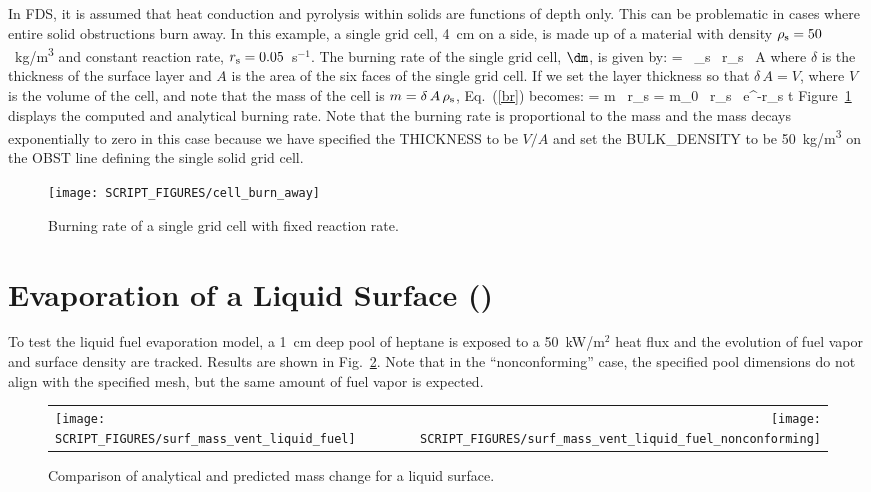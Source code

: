 \documentclass[11pt]{book}
\begin{document}
In FDS, it is assumed that heat conduction and pyrolysis within solids are functions of depth only. This can be problematic in cases where entire solid obstructions burn away. In this example, a single grid cell, 4~cm on a side, is made up of a material with density $\rho_{\rm s}=50$~\si{kg/m^3} and constant reaction rate, $r_{\rm s}=0.05$~s$^{-1}$. The burning rate of the single grid cell, $\dm$, is given by:
\be
   \dm = \delta \, \rho_{\rm s} \, r_{\rm s} \, A  \label{br}
\ee
where $\delta$ is the thickness of the surface layer and $A$ is the area of the six faces of the single grid cell. If we set the layer thickness so that $\delta \, A=V$, where $V$ is the volume of the cell, and note that the mass of the cell is $m=\delta \, A \, \rho_{\rm s}$, Eq.~(\ref{br}) becomes:
\be
   \dm = m \, r_{\rm s} = m_0 \, r_{\rm s} \, {\rm e}^{-r_{\rm s} t}
\ee
Figure~\ref{cell_burn_away_fig} displays the computed and analytical burning rate. Note that the burning rate is proportional to the mass and the mass decays exponentially to zero in this case because we have specified the {\ct THICKNESS} to be $V/A$ and set the {\ct BULK\_DENSITY} to be 50~\si{kg/m^3} on the {\ct OBST} line defining the single solid grid cell.
\begin{figure}[!htb]
\centering
\texttt{[image: SCRIPT\_FIGURES/cell\_burn\_away]}
\caption[The {\ct cell\_burn\_away} test case.]{Burning rate of a single grid cell with fixed reaction rate.}
\label{cell_burn_away_fig}
\end{figure}




\section{Evaporation of a Liquid Surface (\texorpdfstring{}{surf\_mass\_vent\_liquid})}
\label{surf_mass_vent_liquid_fuel}
\label{surf_mass_vent_liquid_fuel_nonconforming}

To test the liquid fuel evaporation model, a 1~cm deep pool of heptane is exposed to a 50~kW/m$^2$ heat flux and the evolution of fuel vapor and surface density are tracked. Results are shown in Fig.~\ref{surf_mass_vent_liquid}. Note that in the ``nonconforming'' case, the specified pool dimensions do not align with the specified mesh, but the same amount of fuel vapor is expected.

\begin{figure}[!htb]
\begin{tabular*}{\textwidth}{l@{\extracolsep{\fill}}r}
\texttt{[image: SCRIPT\_FIGURES/surf\_mass\_vent\_liquid\_fuel]} &
\texttt{[image: SCRIPT\_FIGURES/surf\_mass\_vent\_liquid\_fuel\_nonconforming]}
\end{tabular*}
\caption[The  test cases]{Comparison of analytical and predicted mass change for a liquid surface.}
\label{surf_mass_vent_liquid}
\end{figure}
\end{document}
